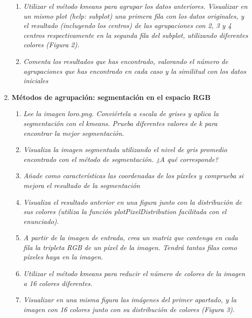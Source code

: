 \documentclass{article}
\begin{document}
\begin{enumerate}
\begin{enumerate}
 \item \textit{Utilizar el método kmeans para agrupar los datos anteriores. Visualizar en 
un mismo plot (help: subplot) una primera fila con los datos originales, y 
el  resultado  (incluyendo  los  centros)  de  las  agrupaciones  con  2,  3  y  4 
centros  respectivamente  en  la  segunda  fila  del  subplot,  utilizando 
diferentes colores (Figura 2).}

 \item \textit{Comenta  los  resultados  que  has  encontrado,  valorando  el  número  de 
agrupaciones que has encontrado en cada caso y la similitud con los datos 
iniciales}
 
 \end{enumerate}

\newpage

 \item \textbf{Métodos de agrupación: segmentación en el espacio RGB}

 \begin{enumerate}
 \item \textit{Lee  la  imagen   loro.png.  Conviértela  a  escala  de  grises  y  aplica  la 
segmentación  con  el  kmeans.  Prueba  diferentes  valores  de  k para 
encontrar la mejor segmentación.}

 \item \textit{Visualiza  la  imagen  segmentada  utilizando  el  nivel  de  gris  promedio 
encontrado con el método de segmentación. ¿A qué corresponde?}

 \item \textit{Añade como características las coordenadas de los píxeles y comprueba si 
mejora el resultado de la segmentación}

  \item \textit{Visualiza el resultado anterior en una  figura junto con la distribución de 
sus  colores  (utiliza  la  función plotPixelDistribution facilitada  con  el 
enunciado).}
  
  \item \textit{A partir de la imagen de entrada, crea un matriz que contenga en cada fila la tripleta RGB de un píxel de la imagen. Tendrá tantas filas como píxeles 
haya en la imagen.}

 \item \textit{Utilizar el método kmeans para reducir el número de colores de la imagen 
a 16 colores diferentes.}
 
 \item \textit{Visualizar  en  una  misma  figura  las  imágenes  del  primer  apartado,  y  la 
imagen con 16 colores junto con su distribución de colores (Figura 3).} 
 

\end{enumerate}
\end{enumerate}
\end{document}
